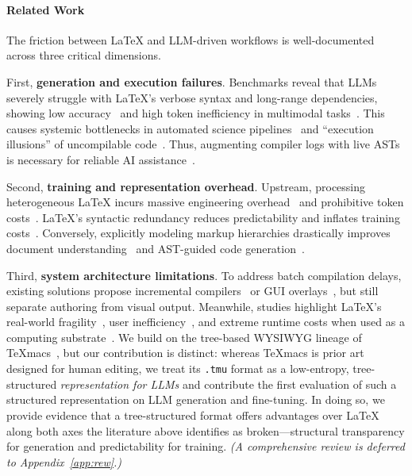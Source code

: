 \paragraph{Related Work}
The friction between \LaTeX{} and LLM-driven workflows is well-documented across three critical dimensions.

First, \textbf{generation and execution failures}. Benchmarks reveal that LLMs severely struggle with \LaTeX{}'s verbose syntax and long-range dependencies, showing low accuracy~\cite{kale2025texpert} and high token inefficiency in multimodal tasks~\cite{ling_table2latex_2025, xia2024docgenome}. This causes systemic bottlenecks in automated science pipelines~\cite{lu2024aiscientist} and ``execution illusions'' of uncompilable code~\cite{lyn2025translatex}. Thus, augmenting compiler logs with live ASTs is necessary for reliable AI assistance~\cite{jain2026bibby}.

Second, \textbf{training and representation overhead}. Upstream, processing heterogeneous \LaTeX{} incurs massive engineering overhead~\cite{paster2023openwebmath} and prohibitive token costs~\cite{lin2024accurate}. \LaTeX{}'s syntactic redundancy reduces predictability and inflates training costs~\cite{taylor2022galactica}. Conversely, explicitly modeling markup hierarchies drastically improves document understanding~\cite{li2022markuplm} and AST-guided code generation~\cite{zeng2026treediffastguidedcodegeneration}.

Third, \textbf{system architecture limitations}. To address batch compilation delays, existing solutions propose incremental compilers~\cite{madje2023typst, haug2022typst} or GUI overlays~\cite{gobert2022ilatex}, but still separate authoring from visual output. Meanwhile, studies highlight \LaTeX{}'s real-world fragility~\cite{tan2024inconsistencies}, user inefficiency~\cite{knauff2014efficiency}, and extreme runtime costs when used as a computing substrate~\cite{gardner2025neuralatex}. We build on the tree-based WYSIWYG lineage of \TeX{}macs~\cite{van_der_hoeven_gnu_2001}, but our contribution is distinct: whereas \TeX{}macs is prior art designed for human editing, we treat its \texttt{.tmu} format as a low-entropy, tree-structured \emph{representation for LLMs} and contribute the first evaluation of such a structured representation on LLM generation and fine-tuning. In doing so, we provide evidence that a tree-structured format offers advantages over \LaTeX{} along both axes the literature above identifies as broken---structural transparency for generation and predictability for training. \textit{(A comprehensive review is deferred to Appendix~\ref{app:rew}.)}